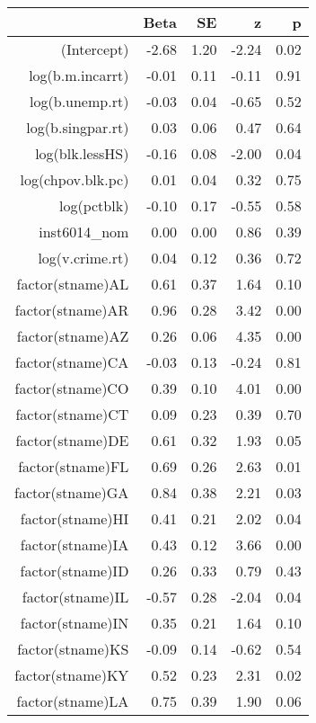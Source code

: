 \begin{table}[ht]
\centering
\begin{tabular}{rrrrr}
  \hline
 & Beta & SE & z & p \\ 
  \hline
(Intercept) & -2.68 & 1.20 & -2.24 & 0.02 \\ 
  log(b.m.incarrt) & -0.01 & 0.11 & -0.11 & 0.91 \\ 
  log(b.unemp.rt) & -0.03 & 0.04 & -0.65 & 0.52 \\ 
  log(b.singpar.rt) & 0.03 & 0.06 & 0.47 & 0.64 \\ 
  log(blk.lessHS) & -0.16 & 0.08 & -2.00 & 0.04 \\ 
  log(chpov.blk.pc) & 0.01 & 0.04 & 0.32 & 0.75 \\ 
  log(pctblk) & -0.10 & 0.17 & -0.55 & 0.58 \\ 
  inst6014\_nom & 0.00 & 0.00 & 0.86 & 0.39 \\ 
  log(v.crime.rt) & 0.04 & 0.12 & 0.36 & 0.72 \\ 
  factor(stname)AL & 0.61 & 0.37 & 1.64 & 0.10 \\ 
  factor(stname)AR & 0.96 & 0.28 & 3.42 & 0.00 \\ 
  factor(stname)AZ & 0.26 & 0.06 & 4.35 & 0.00 \\ 
  factor(stname)CA & -0.03 & 0.13 & -0.24 & 0.81 \\ 
  factor(stname)CO & 0.39 & 0.10 & 4.01 & 0.00 \\ 
  factor(stname)CT & 0.09 & 0.23 & 0.39 & 0.70 \\ 
  factor(stname)DE & 0.61 & 0.32 & 1.93 & 0.05 \\ 
  factor(stname)FL & 0.69 & 0.26 & 2.63 & 0.01 \\ 
  factor(stname)GA & 0.84 & 0.38 & 2.21 & 0.03 \\ 
  factor(stname)HI & 0.41 & 0.21 & 2.02 & 0.04 \\ 
  factor(stname)IA & 0.43 & 0.12 & 3.66 & 0.00 \\ 
  factor(stname)ID & 0.26 & 0.33 & 0.79 & 0.43 \\ 
  factor(stname)IL & -0.57 & 0.28 & -2.04 & 0.04 \\ 
  factor(stname)IN & 0.35 & 0.21 & 1.64 & 0.10 \\ 
  factor(stname)KS & -0.09 & 0.14 & -0.62 & 0.54 \\ 
  factor(stname)KY & 0.52 & 0.23 & 2.31 & 0.02 \\ 
  factor(stname)LA & 0.75 & 0.39 & 1.90 & 0.06 \\ 

\end{tabular}
\end{table}
